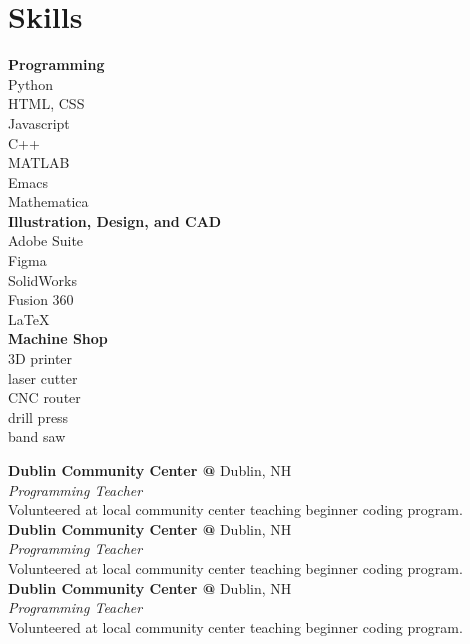 \documentclass[10pt]{article} %
\begin{document}
\begin{minipage}[t]{0.2\textwidth}
 \section*{Skills}
\textbf{Programming}\\
Python\\
HTML, CSS\\
Javascript\\
C++\\
MATLAB\\
Emacs\\
Mathematica\\

\textbf{Illustration, Design, and CAD}\\
Adobe Suite\\
Figma\\
SolidWorks\\
Fusion 360\\
LaTeX\\
\textbf{Machine Shop}\\
3D printer\\ laser cutter\\ CNC router\\ drill press\\ band saw
\end{minipage}
\begin{minipage}[t]{0.8\textwidth}
\textbf{Dublin Community Center @} \space Dublin, NH \\
\textit{Programming Teacher}\\
Volunteered at local community center teaching beginner coding program.
\textbf{Dublin Community Center @} \space Dublin, NH \\
\textit{Programming Teacher}\\
Volunteered at local community center teaching beginner coding program.
\textbf{Dublin Community Center @} \space Dublin, NH \\
\textit{Programming Teacher}\\
Volunteered at local community center teaching beginner coding program.
\end{minipage}
\end{document}
